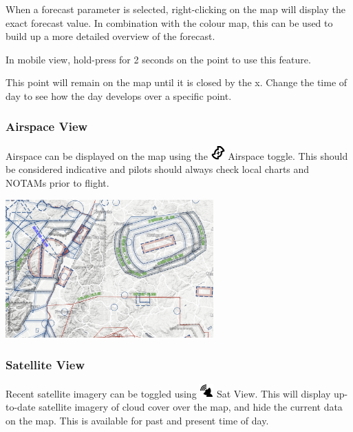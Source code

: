 \documentclass[11pt,a4paper]{article}
\begin{document}
When a forecast parameter is selected, right-clicking on the map will display the exact forecast value. In combination with the colour map, this can be used to build up a more detailed overview of the forecast.

In mobile view, hold-press for 2 seconds on the point to use this feature.

\begin{tip}
\item This point will remain on the map until it is closed by the x. Change the time of day to see how the day develops over a specific point.
\end{tip}

\subsubsection{Airspace View}
Airspace can be displayed on the map using the \includegraphics[height=15pt]{images/icons/airspace.png} Airspace toggle. This should be considered indicative and pilots should always check local charts and NOTAMs prior to flight.
\begin{center}
\includegraphics[width=8cm]{images/airspace.png}
\end{center}

\subsubsection{Satellite View} \label{subsec:satview}
Recent satellite imagery can be toggled using \includegraphics[height=15pt]{images/icons/sat.png} Sat View. This will display up-to-date satellite imagery of cloud cover over the map, and hide the current data on the map. This is available for past and present time of day.
\end{document}
